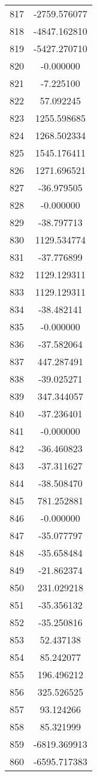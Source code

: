 \documentclass[12pt]{article}
\begin{document}
\begin{longtable}{@{}cc@{}}
817 & -2759.576077 \\
818 & -4847.162810 \\
819 & -5427.270710 \\
820 & -0.000000 \\
821 & -7.225100 \\
822 & 57.092245 \\
823 & 1255.598685 \\
824 & 1268.502334 \\
825 & 1545.176411 \\
826 & 1271.696521 \\
827 & -36.979505 \\
828 & -0.000000 \\
829 & -38.797713 \\
830 & 1129.534774 \\
831 & -37.776899 \\
832 & 1129.129311 \\
833 & 1129.129311 \\
834 & -38.482141 \\
835 & -0.000000 \\
836 & -37.582064 \\
837 & 447.287491 \\
838 & -39.025271 \\
839 & 347.344057 \\
840 & -37.236401 \\
841 & -0.000000 \\
842 & -36.460823 \\
843 & -37.311627 \\
844 & -38.508470 \\
845 & 781.252881 \\
846 & -0.000000 \\
847 & -35.077797 \\
848 & -35.658484 \\
849 & -21.862374 \\
850 & 231.029218 \\
851 & -35.356132 \\
852 & -35.250816 \\
853 & 52.437138 \\
854 & 85.242077 \\
855 & 196.496212 \\
856 & 325.526525 \\
857 & 93.124266 \\
858 & 85.321999 \\
859 & -6819.369913 \\
860 & -6595.717383 \\

\end{longtable}
\end{document}

